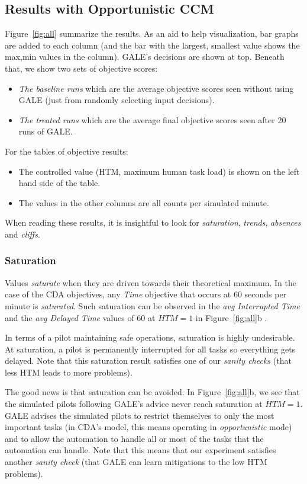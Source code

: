 \documentclass[journal]{IEEEtran}
\newcommand{\bi}{\begin{itemize}}
\newcommand{\ei}{\end{itemize}}
\newcommand{\fig}[1]{Figure~\ref{fig:#1}}
\begin{document}
\subsection{ Results with Opportunistic CCM}
\fig{all} summarize
the results.
As an aid to help visualization, bar graphs are added to each column (and the bar with the largest, smallest value shows the max,min values in the column).
GALE's decisions are shown at top.
Beneath that, we show two sets of objective scores:
\bi
\item {\em The baseline runs} which are the average objective scores seen without using GALE (just from randomly selecting input decisions).
\item {\em The treated runs} which are the average final objective scores seen after 20 runs of GALE.
\ei
For the tables of objective results:
\bi
\item The controlled value (HTM, maximum human task load) is shown on the left hand side of the table.
\item The values in the other columns are all counts per simulated minute.
\ei
When reading these results, it is insightful to look for {\em saturation}, {\em trends}, {\em absences} and {\em cliffs}. 


\subsubsection{Saturation}

Values {\em saturate} when they are driven towards their theoretical maximum. 
In the case of the CDA objectives, any {\em Time} objective that occurs at 60 seconds per minute is {\em saturated}. 
Such saturation can be observed in the {\em avg Interrupted Time} and the {\em avg Delayed Time} values of 60 at  $\mathit{HTM}=1$ in \fig{all}b .

In terms of a pilot maintaining safe operations, saturation is highly undesirable. At saturation, a pilot is permanently interrupted for all tasks so everything gets delayed.  
Note that this saturation result satisfies  one of our {\em sanity checks} (that less HTM leads to more problems).

The good news is that saturation can be avoided. 
In \fig{all}b, we see that the simulated pilots following GALE's advice never
reach saturation at $\mathit{HTM}=1$.
GALE advises the simulated pilots to restrict themselves to only the most important tasks (in CDA's model, this means operating in {\em opportunistic} mode) and to allow the automation to handle all or most of the tasks that the automation can handle.
Note that this  means that our experiment satisfies  another {\em sanity check} (that GALE can learn mitigations to the low HTM problems).
\end{document}
